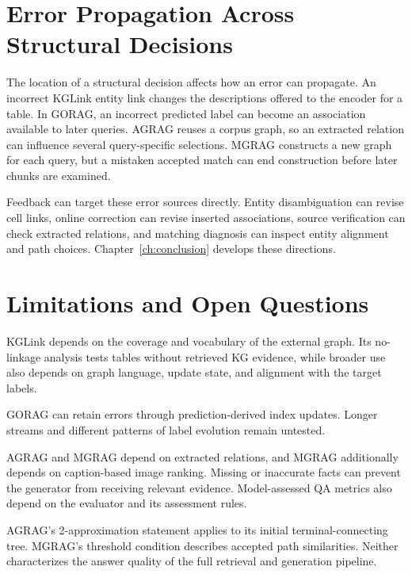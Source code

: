 \section{Error Propagation Across Structural Decisions}
\label{sec:discussion:unit}
The location of a structural decision affects how an error can propagate. An incorrect KGLink entity link changes the descriptions offered to the encoder for a table. In GORAG, an incorrect predicted label can become an association available to later queries. AGRAG reuses a corpus graph, so an extracted relation can influence several query-specific selections. MGRAG constructs a new graph for each query, but a mistaken accepted match can end construction before later chunks are examined.

Feedback can target these error sources directly. Entity disambiguation can revise cell links, online correction can revise inserted associations, source verification can check extracted relations, and matching diagnosis can inspect entity alignment and path choices. Chapter~\ref{ch:conclusion} develops these directions.

\section{Limitations and Open Questions}
\label{sec:discussion:limitations}
KGLink depends on the coverage and vocabulary of the external graph. Its no-linkage analysis tests tables without retrieved KG evidence, while broader use also depends on graph language, update state, and alignment with the target labels.

GORAG can retain errors through prediction-derived index updates. Longer streams and different patterns of label evolution remain untested.

AGRAG and MGRAG depend on extracted relations, and MGRAG additionally depends on caption-based image ranking. Missing or inaccurate facts can prevent the generator from receiving relevant evidence. Model-assessed QA metrics also depend on the evaluator and its assessment rules.

AGRAG's 2-approximation statement applies to its initial terminal-connecting tree. MGRAG's threshold condition describes accepted path similarities. Neither characterizes the answer quality of the full retrieval and generation pipeline.
